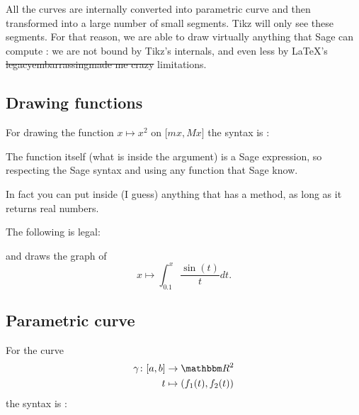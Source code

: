 All the curves are internally converted into parametric curve and then transformed into a large number of small segments. Tikz will only see these segments. For that reason, we are able to draw virtually anything that Sage can compute : we are not bound by Tikz's internals, and even less by \LaTeX's \sout{legacy}\sout{embarrassing}\sout{made me crazy} limitations.

\subsection{Drawing functions}

For drawing the function \( x\mapsto x^2\) on \( \mathopen[ mx , Mx \mathclose]\) the syntax is :



The function itself (what is inside the  argument) is a Sage expression, so respecting the Sage syntax and using any function that Sage know.

In fact you can put inside  (I guess) anything that has a  method, as long as it returns real numbers.

The following is legal:

and draws the graph of
\begin{equation}
    x\mapsto \int_{0.1}^x\frac{ \sin(t) }{ t }dt.
\end{equation}

\subsection{Parametric curve}

For the curve
\begin{equation}
    \begin{aligned}
        \gamma\colon \mathopen[ a , b \mathclose]&\to \eR^2 \\
        t&\mapsto (  f_1(t),f_2(t)  ) 
    \end{aligned}
\end{equation}
the syntax is :


